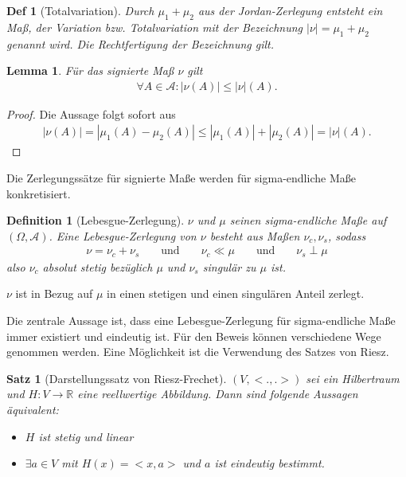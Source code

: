 \documentclass[]{article}
\newtheorem{theorem}{Satz}
\newtheorem{lemma}{Lemma}
\newtheorem{definition}{Definition}
\newtheorem*{definition*}{Def}
\begin{document}
\begin{definition*}[Totalvariation]
	Durch $\mu_1 + \mu_2$ aus der Jordan-Zerlegung entsteht ein Maß, der Variation bzw. Totalvariation mit der Bezeichnung $|\nu| = \mu_1 + \mu_2$ genannt wird. Die Rechtfertigung der Bezeichnung gilt.
\end{definition*}

\begin{lemma}
	Für das signierte Maß $\nu$ gilt
	\begin{align*}
		\forall A \in \mathcal{A}: |\nu(A)| \leq |\nu|(A).
	\end{align*}
\end{lemma}
\begin{proof}
	Die Aussage folgt sofort aus
	\begin{align*}
		|\nu(A)| = |\mu_1(A) - \mu_2(A)| \leq |\mu_1(A)| + |\mu_2(A)| = |\nu|(A).
	\end{align*}
\end{proof}

Die Zerlegungssätze für signierte Maße werden für sigma-endliche Maße konkretisiert.

\begin{definition}[Lebesgue-Zerlegung]
	$\nu$ und $\mu$ seinen sigma-endliche Maße auf $(\Omega, \mathcal{A})$. Eine Lebesgue-Zerlegung von $\nu$ besteht aus Maßen $\nu_c,\nu_s$, sodass
	\begin{align*}
		\nu = \nu_c + \nu_s && \text{ und } && \nu_c \ll \mu && \text{ und } &&
		\nu_s \perp \mu
	\end{align*}
	also $\nu_c$ absolut stetig bezüglich $\mu$ und $\nu_s$ singulär zu $\mu$ ist.
\end{definition}

$\nu$ ist in Bezug auf $\mu$ in einen stetigen und einen singulären Anteil zerlegt.

Die zentrale Aussage ist, dass eine Lebesgue-Zerlegung für sigma-endliche Maße immer existiert und eindeutig ist. Für den Beweis können verschiedene Wege genommen werden. Eine Möglichkeit ist die Verwendung des Satzes von Riesz.

\begin{theorem}[Darstellungssatz von Riesz-Frechet]
	$(V,<.,.>)$ sei ein Hilbertraum und $H:V\rightarrow\mathbb{R}$ eine reellwertige Abbildung. Dann sind folgende Aussagen äquivalent:
	\begin{itemize}
		\item $H$ ist stetig und linear
		\item $\exists a \in V$ mit $H(x) = <x,a>$ und $a$ ist eindeutig bestimmt.
	\end{itemize}
\end{theorem}
\end{document}
